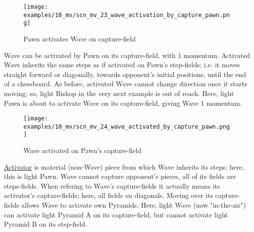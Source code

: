 \vspace*{-1.5\baselineskip}
\noindent
\begin{figure}[!h]
\texttt{[image: examples/10\_mv/scn\_mv\_23\_wave\_activation\_by\_capture\_pawn.png]}
\vspace*{-1.4\baselineskip}
\caption{Pawn activates Wave on capture-field}
\label{fig:scn_mv_23_wave_activation_by_capture_pawn}
\end{figure}

\vspace*{-0.5\baselineskip}
Wave can be activated by Pawn on its capture-field, with 1 momentum. Activated
Wave inherits the same steps as if activated on Pawn's step-fields; i.e. it moves
straight forward or diagonally, towards opponent's initial positions, until the
end of a chessboard. As before, activated Wave cannot change direction once it
starts moving; so, light Bishop in the very next example is out of reach.
Here, light Pawn is about to activate Wave on its capture-field, giving Wave 1
momentum.

\clearpage %

\vspace*{-2.1\baselineskip}
\noindent
\begin{figure}[!h]
\texttt{[image: examples/10\_mv/scn\_mv\_24\_wave\_activated\_by\_capture\_pawn.png]}
\vspace*{-1.4\baselineskip}
\caption{Wave activated on Pawn's capture-field}
\label{fig:scn_mv_24_wave_activated_by_capture_pawn}
\end{figure}

\vspace*{-0.5\baselineskip}
\hyperref[sec:Terms/Activator]{Activator} is material (non-Wave) piece from which
Wave inherits its steps; here, this is light Pawn. Wave cannot capture opponent's
pieces, all of its fields are steps-fields. When refering to Wave's capture-fields
it actually means its activator's capture-fields; here, all fields on diagonals.\newline
\indent
Moving over its capture-fields allows Wave to activate own Pyramids. Here, light
Wave (now "in-the-air") can activate light Pyramid A on its capture-field, but
cannot activate light Pyramid B on its step-field.

\clearpage %

